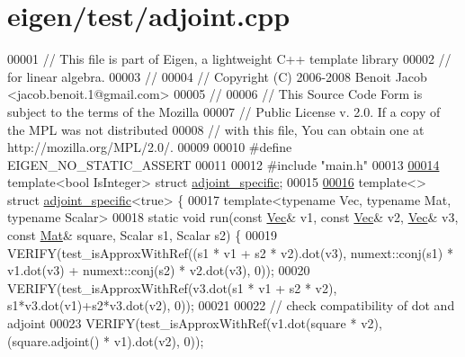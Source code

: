 \hypertarget{eigen_2test_2adjoint_8cpp_source}{}\section{eigen/test/adjoint.cpp}
\label{eigen_2test_2adjoint_8cpp_source}

\begin{DoxyCode}
00001 \textcolor{comment}{// This file is part of Eigen, a lightweight C++ template library}
00002 \textcolor{comment}{// for linear algebra.}
00003 \textcolor{comment}{//}
00004 \textcolor{comment}{// Copyright (C) 2006-2008 Benoit Jacob <jacob.benoit.1@gmail.com>}
00005 \textcolor{comment}{//}
00006 \textcolor{comment}{// This Source Code Form is subject to the terms of the Mozilla}
00007 \textcolor{comment}{// Public License v. 2.0. If a copy of the MPL was not distributed}
00008 \textcolor{comment}{// with this file, You can obtain one at http://mozilla.org/MPL/2.0/.}
00009 
00010 \textcolor{preprocessor}{#define EIGEN\_NO\_STATIC\_ASSERT}
00011 
00012 \textcolor{preprocessor}{#include "main.h"}
00013 
\hyperlink{structadjoint__specific}{00014} \textcolor{keyword}{template}<\textcolor{keywordtype}{bool} IsInteger> \textcolor{keyword}{struct }\hyperlink{structadjoint__specific}{adjoint\_specific};
00015 
\hyperlink{structadjoint__specific_3_01true_01_4}{00016} \textcolor{keyword}{template}<> \textcolor{keyword}{struct }\hyperlink{structadjoint__specific}{adjoint\_specific}<true> \{
00017   \textcolor{keyword}{template}<\textcolor{keyword}{typename} Vec, \textcolor{keyword}{typename} Mat, \textcolor{keyword}{typename} Scalar>
00018   \textcolor{keyword}{static} \textcolor{keywordtype}{void} run(\textcolor{keyword}{const} \hyperlink{group___core___module_class_eigen_1_1_matrix}{Vec}& v1, \textcolor{keyword}{const} \hyperlink{group___core___module_class_eigen_1_1_matrix}{Vec}& v2, \hyperlink{group___core___module_class_eigen_1_1_matrix}{Vec}& v3, \textcolor{keyword}{const} \hyperlink{group___core___module}{Mat}& square, Scalar s1, Scalar 
      s2) \{
00019     VERIFY(test\_isApproxWithRef((s1 * v1 + s2 * v2).dot(v3),     numext::conj(s1) * v1.dot(v3) + 
      numext::conj(s2) * v2.dot(v3), 0));
00020     VERIFY(test\_isApproxWithRef(v3.dot(s1 * v1 + s2 * v2),       s1*v3.dot(v1)+s2*v3.dot(v2), 0));
00021     
00022     \textcolor{comment}{// check compatibility of dot and adjoint}
00023     VERIFY(test\_isApproxWithRef(v1.dot(square * v2), (square.adjoint() * v1).dot(v2), 0));

\end{DoxyCode}
